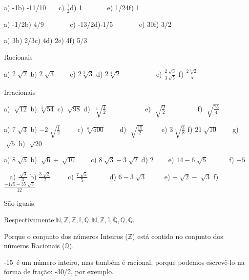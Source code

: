 \begin{respostas}{4}
	\ansitem{} a) -1\quad b) -11/10~~~ \quad c) $\frac{1}{2}$\quad  d) 1 ~~~~~~ e) 1/24\quad f) 1

	\ansitem{} a) -1/2\quad b) 4/9~~~~~~~ c) -13/2\quad d)-1/5~~~~~~~ e) 30\quad f) 3/2
\end{respostas}

\begin{respostas}{5}
	\ansitem{} a) 3\quad b) 2/3\quad \quad c) 4\quad d) 2\quad e) 4\quad f) 5/3

	\ansitem{}  Racionais

	\ansitem{} a)  \( 2\sqrt[]{2} \) \quad b)  \( 2\sqrt[]{3} \) ~~~ \quad c)  \( 2\sqrt[3]{3} \) \quad \quad d)  \( 2\sqrt[4]{2} \) ~~~~~~~~~ e)  \( \frac{2\sqrt[]{3}}{3\sqrt[]{5}} \) \quad \quad f)  \( \frac{2\sqrt[3]{2}}{5} \) 

	\ansitem{}  Irracionais 

	\ansitem{}  a)  \( \sqrt[]{12} \) \quad b)  \( \sqrt[3]{54} \) \quad \quad c)  \( \sqrt[]{98} \) \quad \quad d) \( ~\sqrt[3]{\frac{1}{2}} \) ~~~~~~~~~~ e)  \( \sqrt[]{\frac{9}{2}} \) ~~~~~~~~ f)  \( \sqrt[]{\frac{75}{4}} \) 

	\ansitem{} a)  \( 7\sqrt[]{3} \) \quad b)  \( -2\sqrt[]{\frac{1}{2}} \)  ~ ~~ c)  \( \sqrt[6]{500} \) \quad ~~~ d)  \( \sqrt[]{\frac{15}{2}} \) ~~~~ e)  \( 3\sqrt[3]{\frac{3}{8}} \) \quad f)  \( 21\sqrt[]{10} \) ~~~ g)  \( \sqrt[]{5} \) \quad h)  \( \sqrt[]{20} \) 

	\ansitem{}  a)  \( 8\sqrt[]{5} \) \quad b)  \( \sqrt[]{6}+\sqrt[]{10} \) ~~~  c)  \( 8\sqrt[]{3}-3\sqrt[]{2} \) \quad d)  \( 2 \) ~~~ \quad  e)  \( 14-6\sqrt[]{5} \) \quad ~~~~~ f)  \( -5 \) 

	\ansitem{} ~ a)  \( \frac{\sqrt[]{3}}{3} \) \quad b)  \( \frac{3\sqrt[]{2}}{2} \) ~~ ~ c)  \( \frac{7\sqrt[]{5}}{5} \) ~~~~~ d)  \( 6-3\sqrt[]{3} \) ~~~~ e)  \( -\sqrt[]{2}-\sqrt[]{3} \) \quad f)  \( \frac{-175-35\sqrt[]{3}}{22} \) 

	\ansitem{}São iguais.

	\ansitem{} Respectivamente:$\mathbb{N}, \mathbb{Z}, \mathbb{Z}, \mathbb{I}, \mathbb{Q}, \mathbb{N}, \mathbb{Z}, \mathbb{I}, \mathbb{Q}, \mathbb{Q}, \mathbb{Q}$.

	\ansitem{} Porque o conjunto dos números Inteiros ($\mathbb{Z}$) está contido no conjunto dos números Racionais ($\mathbb{Q}$).

	\ansitem{}  -15~é um número inteiro, mas também é racional, porque podemos escrevê-lo  na forma de fração: -30/2, por exemplo.


\end{respostas}
